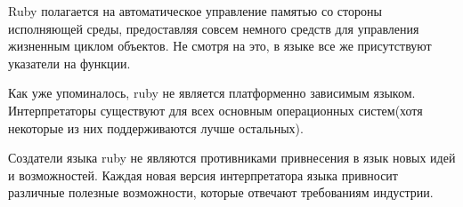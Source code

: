 Ruby полагается на автоматическое управление памятью со стороны исполняющей среды, предоставляя совсем немного средств для управления жизненным циклом объектов.
Не смотря на это, в языке все же присутствуют указатели на функции.

Как уже упоминалось, ruby не является платформенно зависимым языком.
Интерпретаторы существуют для всех основным операционных систем(хотя некоторые из них поддерживаются лучше остальных).


Создатели языка ruby не являются противниками привнесения в язык новых идей и возможностей.
Каждая новая версия интерпретатора языка привносит различные полезные возможности, которые отвечают требованиям индустрии.






